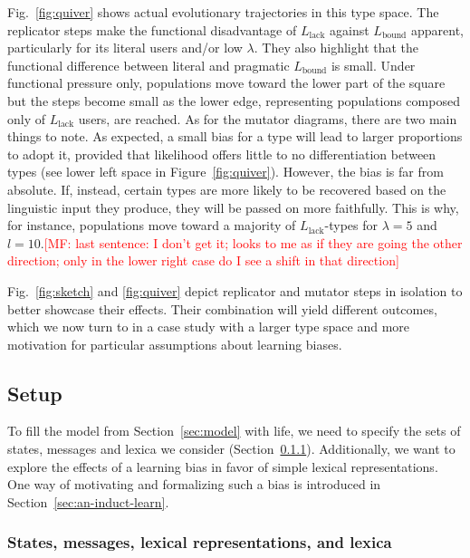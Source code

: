 \documentclass[a4paper, 11pt]{article}
\theoremstyle{Satz}
\newcommand{\mf}[1]{\textcolor{Red}{[MF: #1]}}
\newcommand{\mylang}[1]{\ensuremath{L_{\text{#1}}}\xspace} %
\newcommand{\Lbound}{\mylang{bound}}
\newcommand{\Llack}{\mylang{lack}}
\begin{document}
Fig.~\ref{fig:quiver} shows actual evolutionary trajectories in this type space. The replicator
steps make the functional disadvantage of $\Llack$ against $\Lbound$ apparent, particularly for
its literal users and/or low $\lambda$. They also highlight that the functional difference
between literal and pragmatic $\Lbound$ is small. Under functional pressure only, populations
move toward the lower part of the square but the steps become small as the lower edge,
representing populations composed only of $\Llack$ users, are reached. As for the mutator
diagrams, there are two main things to note. As expected, a small bias for a type will lead to
larger proportions to adopt it, provided that likelihood offers little to no differentiation
between types (see lower left space in Figure~\ref{fig:quiver}). However, the bias is far from
absolute. If, instead, certain types are more likely to be recovered based on the linguistic
input they produce, they will be passed on more faithfully. This is why, for instance,
populations move toward a majority of $\Llack$-types for $\lambda = 5$ and $l = 10$.\mf{last
  sentence: I don't get it; looks to me as if they are going the other direction; only in the
  lower right case do I see a shift in that direction}


Fig.~\ref{fig:sketch} and \ref{fig:quiver} depict replicator and mutator steps in isolation to
better showcase their effects. Their combination will yield different outcomes, which we now
turn to in a case study with a larger type space and more motivation for particular assumptions
about learning biases.


\subsection{Setup}
\label{sec:setup:-stat-conc}

To fill the model from Section~\ref{sec:model} with life, we need to specify the sets of
states, messages and lexica we consider (Section~\ref{sec:stat-mess-conc}). Additionally, we want to
explore the effects of a learning bias in favor of simple lexical representations. One way of
motivating and formalizing such a bias is introduced in Section~\ref{sec:an-induct-learn}.


\subsubsection{States, messages, lexical representations, and lexica} 
\label{sec:stat-mess-conc}
\end{document}
